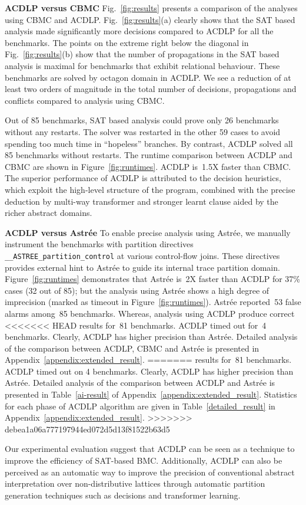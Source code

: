 

%
\noindent \textbf{ACDLP versus CBMC}
Fig.~\ref{fig:results} presents a comparison of the analyses using CBMC
and ACDLP.  Fig.~\ref{fig:results}(a) clearly shows that the SAT based analysis 
made significantly more decisions compared to ACDLP for all the benchmarks. 
The points on the extreme right below the diagonal in
Fig.~\ref{fig:results}(b) show that the number of propagations in the SAT based 
analysis is maximal for benchmarks that exhibit relational behaviour.  These
benchmarks are solved by octagon domain in ACDLP.  We see a reduction of at 
least two orders of magnitude in the total number of decisions, propagations 
and conflicts compared to analysis using CBMC.  

Out of 85 benchmarks, SAT based analysis could prove only 26
benchmarks without any restarts.  The solver was restarted in the other 59 
cases to avoid spending too much time in ``hopeless'' branches.  By contrast, 
ACDLP solved all 85 benchmarks without restarts.  
The runtime comparison between ACDLP and CBMC are shown in 
Figure~\ref{fig:runtimes}.  ACDLP is~1.5X faster than CBMC. 
The superior performance of ACDLP is attributed to the decision heuristics, 
which exploit the high-level structure of the program, combined with the 
precise deduction by multi-way transformer and stronger learnt clause aided 
by the richer abstract domains. 
%


\noindent \textbf{ACDLP versus Astr{\'e}e}
%
To enable precise analysis using Astr{\'e}e, we manually instrument 
the benchmarks with partition directives \texttt{\_\_ASTREE\_partition\_control} 
at various control-flow joins.  These directives provides external hint to
Astr{\'e}e to guide its internal trace partition domain. 
Figure~\ref{fig:runtimes} demonstrates that Astr{\'e}e is~2X faster 
than ACDLP for {37}\% cases (32 out of 85); but the analysis using 
Astr{\'e}e shows a high degree of imprecision (marked as timeout in 
Figure~\ref{fig:runtimes}).  Astr{\'e}e reported~53 false alarms 
among~85 benchmarks.  Whereas, analysis using ACDLP produce correct 
<<<<<<< HEAD
results for~81 benchmarks.  ACDLP timed out for~4 benchmarks. Clearly, ACDLP has higher precision than 
Astr{\'e}e. Detailed analysis of the comparison between ACDLP, CBMC and 
Astr{\'e}e is presented in Appendix~\ref{appendix:extended_result}.  
=======
results for~81 benchmarks. ACDLP timed out on 4 benchmarks.  Clearly, 
ACDLP has higher precision than Astr{\'e}e. Detailed analysis 
of the comparison between ACDLP and 
Astr{\'e}e is presented in Table~\ref{ai-result} of 
Appendix~\ref{appendix:extended_result}.  Statistics for each phase of ACDLP 
algorithm are given in Table~\ref{detailed_result} in Appendix~\ref{appendix:extended_result}.  
>>>>>>> debea1a06a777197944ed072d5d13f81522b63d5


Our experimental evaluation suggest that ACDLP can be seen as a
technique to improve the efficiency of SAT-based BMC.  Additionally, ACDLP can
also be perceived as an automatic way to improve the precision of conventional
abstract interpretation over non-distributive lattices through automatic partition 
generation techniques such as decisions and transformer learning.
